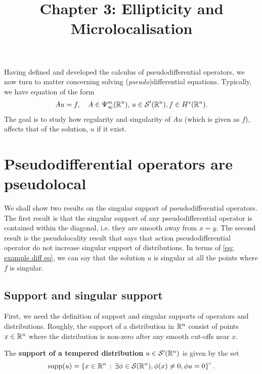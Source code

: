 \documentclass[12pt]{article}
\title{Chapter 3: Ellipticity and Microlocalisation}
\date{}
\begin{document}
\maketitle

Having defined and developed the calculus of pseudodifferential operators, we now turn to matter concerning solving (\textit{pseudo})differential equations. Typically, we have equation of the form
\begin{align}
Au = f, \quad A \in \Psi^{m}_{\infty}({\mathbb R}^n), \, u \in \mathcal{S}'({\mathbb R}^n), f \in H^s({\mathbb R}^n). \label{eq: example diff eq}
\end{align}
The goal is to study how regularity and singularity of $Au$ (which is given as $f$), affects that of the solution, $u$ if it exist. 

\section{Pseudodifferential operators are pseudolocal}
We shall show two results on the singular support of pseudodifferential operators. The first result is that the singular support of any pseudodifferential operator  is contained within the diagonal, i.e. they are smooth away from $x = y$. The second result is the pseudolocality result that says that action pseudodifferential operator do not increase singular support of distributions. In terms of \ref{eq: example diff eq}, we can say that the solution $u$ is singular at all the points where $f$ is singular. 

\subsection{Support and singular support} 
First, we need the definition of support and singular supports of operators and distributions. Roughly, the support of a distribution in ${\mathbb R}^n$ consist of points $x \in {\ensuremath {\mathbb R}}^n$ where the distribution is non-zero after any smooth cut-offs near $x$. 
\begin{fdefinition}
    The \textbf{support of a tempered distribution} $u \in \mathcal{S}'({\mathbb R}^n)$ is given by the set
    \[
    \mathrm{supp}(u) = \left\{x \in {\ensuremath {\mathbb R}}^n \, : \, \exists \phi \in \mathcal{S}({\mathbb R}^n), \phi(x) \neq 0, \phi u = 0\right\}^c. 
    \]
\end{fdefinition}
\end{document}
